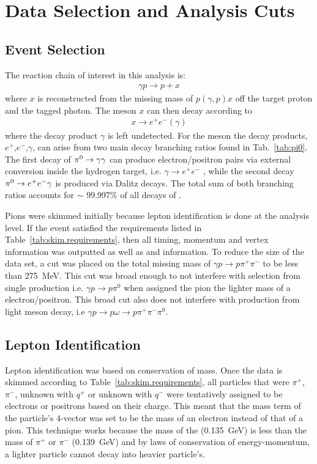 \section{Data Selection and Analysis Cuts}\label{sec:evnt}
\subsection{Event Selection}\label{subsec:evnt}
	The reaction chain of interest in this analysis is:
	\begin{align}
	\gamma p \rightarrow p + x
	\end{align}
	where $x$ is reconstructed from the missing mass of $p(\gamma,p)x$ off the target proton and the tagged photon. The meson $x$ can then decay according to  
	\begin{align}
	x\rightarrow e^{+}e^{-}(\gamma)
	\end{align}
	where the decay product $\gamma$ is left undetected. For the \pizT meson the decay products, $e^+$,$e^-$,$\gamma$, can arise from two main decay branching ratios found in Tab.~\ref{tab:pi0}. The first decay of $\pi^{0}\rightarrow\gamma\gamma$ can produce electron/positron pairs via external conversion inside the hydrogen target, i.e. $\gamma\rightarrow e^+e^-$ , while the second decay $\pi^{0}\rightarrow e^+e^-\gamma$ is produced via Dalitz decays. The total sum of both branching ratios accounts for $\sim$ 99.997\% of all decays of \pizT.
	
	\FloatBarrier
	Pions were skimmed initially because lepton identification is done at the analysis level. If the event satisfied the requirements listed in Table~\ref{tab:skim.requirements}, then all timing, momentum and vertex information was 
	outputted as well as  and  information. To reduce the size of the data set, a cut 
	was placed on the total missing mass of $\gamma p \to p \pi^{+} \pi^{-}$ to be less than 275~MeV. This cut was broad enough to not interfere with \pizT selection from single 
	\pizT production i.e. $\gamma p \to p \pi^{0}$ when assigned the pion the lighter mass of a electron/positron. This broad cut also does not interfere with \pizT production from 
	light meson decay, i.e $\gamma p \to p \omega \to p \pi^{+} \pi^{-} \pi^{0}$. 
		
	
	\FloatBarrier
\subsection{Lepton Identification}
	Lepton identification was based on conservation of mass. Once the data is skimmed according to Table~\ref{tab:skim.requirements}, all particles that were $\pi^+$, $\pi^-$, unknown with $q^+$ or unknown with $q^-$ were tentatively assigned to be electrons or positrons based on their charge. This meant that the mass term of the particle's 4-vector was set to be the mass of an electron instead of that of a pion. This technique works because the mass of the \pizT (0.135~GeV) is less than the mass of $\pi^+$ or $\pi^-$ (0.139~GeV) and by laws of conservation of energy-momentum, a lighter particle cannot decay into heavier particle's.
	
